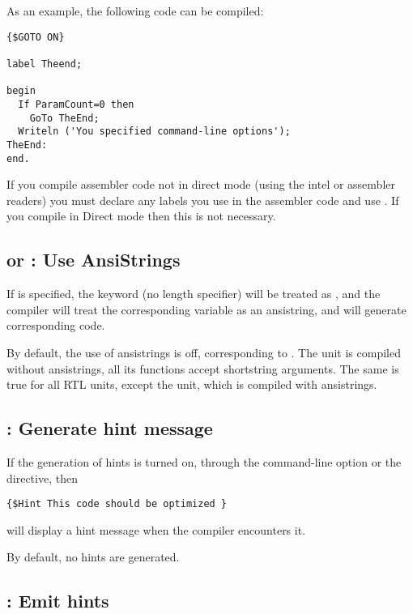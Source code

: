 As an example, the following code can be compiled:
\begin{verbatim}
{$GOTO ON}

label Theend;

begin
  If ParamCount=0 then
    GoTo TheEnd;
  Writeln ('You specified command-line options');
TheEnd:
end.
\end{verbatim}

\begin{remark}If you compile assembler code not in direct mode (using the intel or
assembler readers) you must declare any labels you use in the assembler
code and use . If you compile in Direct mode then this is
not necessary.
\end{remark}

\subsection{ or  : Use AnsiStrings}

If  is specified, the keyword  (no
length specifier) will be treated as , and the compiler
will treat the corresponding variable as an ansistring, and will
generate corresponding code.

By default, the use of ansistrings is off, corresponding to .
The  unit is compiled without ansistrings, all its functions accept
shortstring arguments. The same is true for all RTL units, except the
 unit, which is compiled with ansistrings.

\subsection{ : Generate hint message}

If the generation of hints is turned on, through the  command-line
option or the  directive, then
\begin{verbatim}
{$Hint This code should be optimized }
\end{verbatim}
will display a hint message when the compiler encounters it.

By default, no hints are generated.

\subsection{ : Emit hints}


